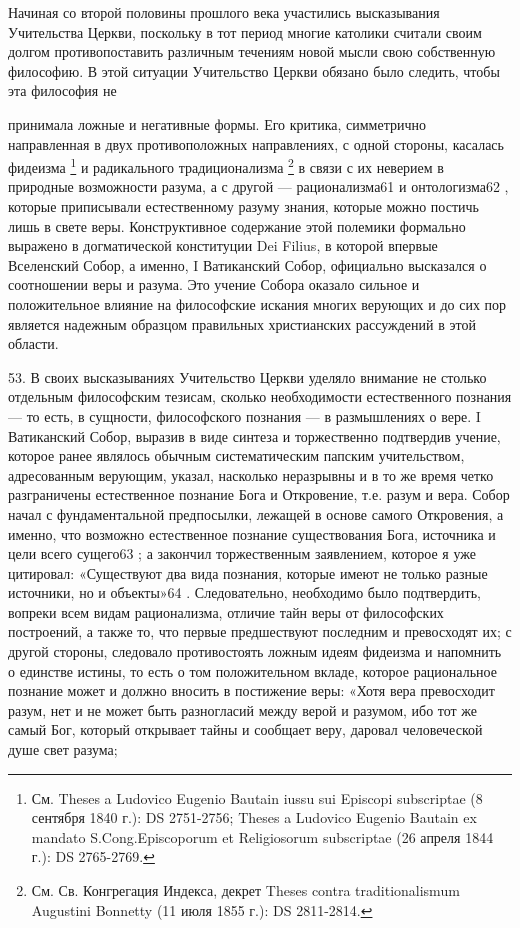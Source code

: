 \documentclass[a5paper,10pt]{article}
\begin{document}
Начиная со второй половины прошлого века участились высказывания Учительства
Церкви, поскольку в тот период многие католики считали своим долгом
противопоставить различным течениям новой мысли свою собственную философию. В
этой ситуации Учительство Церкви обязано было следить, чтобы эта философия не

принимала ложные и негативные формы. Его критика, симметрично направленная в
двух противоположных направлениях, с одной стороны, касалась фидеизма
\footnote{См. Theses a Ludovico Eugenio Bautain iussu sui Episcopi subscriptae
    (8 сентября 1840 г.): DS 2751-2756; Theses a Ludovico Eugenio Bautain ex
    mandato S.Cong.Episcoporum et Religiosorum subscriptae (26 апреля 1844 г.):
    DS 2765-2769.}  и радикального традиционализма \footnote{См. Св.
Конгрегация Индекса, декрет Theses contra traditionalismum Augustini Bonnetty
(11 июля 1855 г.): DS 2811-2814.}  в связи с их неверием в природные
возможности разума, а с другой — рационализма61 и онтологизма62 , которые
приписывали естественному разуму знания, которые можно постичь лишь в свете
веры.  Конструктивное содержание этой полемики формально выражено в
догматической конституции Dei Filius, в которой впервые Вселенский Собор, а
именно, I Ватиканский Собор, официально высказался о соотношении веры и разума.
Это учение Собора оказало сильное и положительное влияние на философские
искания многих верующих и до сих пор является надежным образцом правильных
христианских рассуждений в этой области.

53. В своих высказываниях Учительство Церкви уделяло внимание не столько
отдельным философским тезисам, сколько необходимости естественного познания —
то есть, в сущности, философского познания — в размышлениях о вере. I
Ватиканский Собор, выразив в виде синтеза и торжественно подтвердив учение,
которое ранее являлось обычным систематическим папским учительством,
адресованным верующим, указал, насколько неразрывны и в то же время четко
разграничены естественное познание Бога и Откровение, т.е. разум и вера. Собор
начал с фундаментальной предпосылки, лежащей в основе самого Откровения, а
именно, что возможно естественное познание существования Бога, источника и цели
всего сущего63 ; а закончил торжественным заявлением, которое я уже цитировал:
«Существуют два вида познания, которые имеют не только разные источники, но и
объекты»64 . Следовательно, необходимо было подтвердить, вопреки всем видам
рационализма, отличие тайн веры от философских построений, а также то, что
первые предшествуют последним и превосходят их; с другой стороны, следовало
противостоять ложным идеям фидеизма и напомнить о единстве истины, то есть о
том положительном вкладе, которое рациональное познание может и должно вносить
в постижение веры: «Хотя вера превосходит разум, нет и не может быть
разногласий между верой и разумом, ибо тот же самый Бог, который открывает
тайны и сообщает веру, даровал человеческой душе свет разума;
\end{document}
